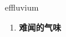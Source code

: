 
\begin{frame}
{\huge effluvium}
\begin{center}
\begin{enumerate}\Large
  \item \textbf{难闻的气味}
\end{enumerate}
\end{center}
\end{frame}
